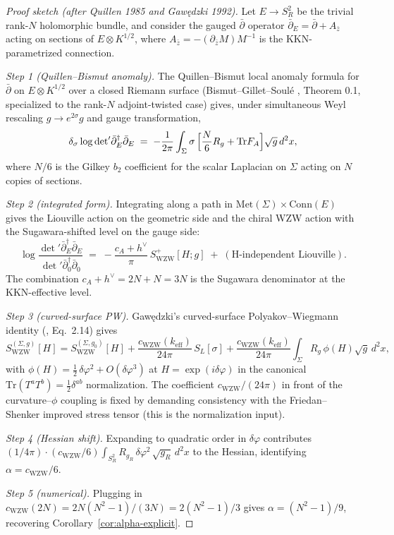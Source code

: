 \documentclass[11pt,letterpaper]{article}
\theoremstyle{definition}
\newcommand{\Tr}{\mathrm{Tr}}
\begin{document}
\begin{proof}[Proof sketch (after Quillen 1985 and Gaw\k{e}dzki 1992)]
Let $E \to S^2_R$ be the trivial rank-$N$ holomorphic bundle, and consider the gauged $\bar\partial$ operator $\bar\partial_E = \bar\partial + A_{\bar z}$ acting on sections of $E \otimes K^{1/2}$, where $A_{\bar z} = -(\partial_{\bar z} M) M^{-1}$ is the KKN-parametrized connection.

\emph{Step 1 (Quillen--Bismut anomaly).} The Quillen--Bismut local anomaly formula for $\bar\partial$ on $E\otimes K^{1/2}$ over a closed Riemann surface (Bismut--Gillet--Soul\'e \cite{BismutGilletSoule1988}, Theorem 0.1, specialized to the rank-$N$ adjoint-twisted case) gives, under simultaneous Weyl rescaling $g\to e^{2\sigma}g$ and gauge transformation,
\[
\delta_\sigma \log\det\nolimits'\!\bar\partial_E^\dagger \bar\partial_E \;=\; -\frac{1}{2\pi}\int_\Sigma \sigma\,\Bigl[\frac{N}{6} R_g + \Tr F_A\Bigr]\sqrt{g}\,d^2x,
\]
where $N/6$ is the Gilkey $b_2$ coefficient for the scalar Laplacian on $\Sigma$ acting on $N$ copies of sections.

\emph{Step 2 (integrated form).} Integrating along a path in $\mathrm{Met}(\Sigma)\times\mathrm{Conn}(E)$ gives the Liouville action on the geometric side and the chiral WZW action with the Sugawara-shifted level on the gauge side:
\[
\log\frac{\det'\!\bar\partial_E^\dagger\bar\partial_E}{\det'\!\bar\partial_0^\dagger\bar\partial_0} \;=\; -\frac{c_A + h^\vee}{\pi}\,S^+_{\mathrm{WZW}}[H;g] \;+\; (\text{H-independent Liouville}).
\]
The combination $c_A + h^\vee = 2N + N = 3N$ is the Sugawara denominator at the KKN-effective level.

\emph{Step 3 (curved-surface PW).} Gaw\k{e}dzki's curved-surface Polyakov--Wiegmann identity (\cite{Gawedzki1992}, Eq.\ 2.14) gives
\[
S_{\mathrm{WZW}}^{(\Sigma, g)}[H] = S_{\mathrm{WZW}}^{(\Sigma, g_0)}[H] + \frac{c_{\mathrm{WZW}}(k_{\mathrm{eff}})}{24\pi}\,S_L[\sigma] + \frac{c_{\mathrm{WZW}}(k_{\mathrm{eff}})}{24\pi}\int_\Sigma R_g\,\phi(H)\sqrt{g}\,d^2x,
\]
with $\phi(H) = \tfrac{1}{2}\,\delta\varphi^2 + O(\delta\varphi^3)$ at $H = \exp(i\delta\varphi)$ in the canonical $\Tr(T^aT^b) = \tfrac{1}{2}\delta^{ab}$ normalization. The coefficient $c_{\mathrm{WZW}}/(24\pi)$ in front of the curvature--$\phi$ coupling is fixed by demanding consistency with the Friedan--Shenker improved stress tensor (this is the normalization input).

\emph{Step 4 (Hessian shift).} Expanding to quadratic order in $\delta\varphi$ contributes $(1/4\pi)\cdot(c_{\mathrm{WZW}}/6)\int_{S^2_R} R_{g_R}\,\delta\varphi^2\,\sqrt{g_R}\,d^2x$ to the Hessian, identifying $\alpha = c_{\mathrm{WZW}}/6$.

\emph{Step 5 (numerical).} Plugging in $c_{\mathrm{WZW}}(2N) = 2N(N^2-1)/(3N) = 2(N^2-1)/3$ gives $\alpha = (N^2-1)/9$, recovering Corollary~\ref{cor:alpha-explicit}.
\end{proof}
\end{document}
